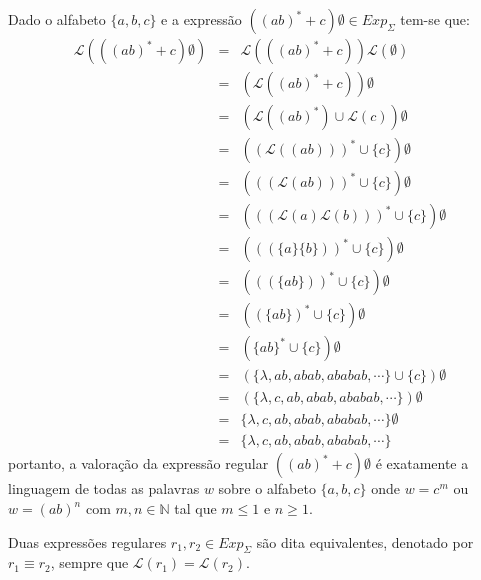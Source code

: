 \begin{example}
	Dado o alfabeto $\{a,b,c\}$ e a expressão $((ab)^* + c)\emptyset \in Exp_\Sigma$ tem-se que:
	\begin{eqnarray*}
		\mathcal{L}(((ab)^* + c) \emptyset) & = & \mathcal{L}(((ab)^* + c))\mathcal{L}(\emptyset)\\
		& = & (\mathcal{L}((ab)^* + c))\emptyset\\
		& = & (\mathcal{L}((ab)^*) \cup \mathcal{L}(c))\emptyset\\
		& = & ((\mathcal{L}((ab)))^* \cup \{c\})\emptyset\\
		& = & (((\mathcal{L}(ab)))^* \cup \{c\})\emptyset\\
		& = & (((\mathcal{L}(a)\mathcal{L}(b)))^* \cup \{c\})\emptyset\\
		& = & (((\{a\}\{b\}))^* \cup \{c\})\emptyset\\
		& = & (((\{ab\}))^* \cup \{c\})\emptyset\\
		& = & ((\{ab\})^* \cup \{c\})\emptyset\\
		& = & (\{ab\}^* \cup \{c\})\emptyset\\
		& = & (\{\lambda, ab, abab, ababab, \cdots\} \cup \{c\})\emptyset\\
		& = & (\{\lambda, c, ab, abab, ababab, \cdots\})\emptyset\\
		& = & \{\lambda, c, ab, abab, ababab, \cdots\}\emptyset\\
		& = & \{\lambda, c, ab, abab, ababab, \cdots\}
	\end{eqnarray*}
	portanto, a valoração da expressão regular $((ab)^* + c)\emptyset$ é exatamente a linguagem de todas as palavras $w$ sobre o alfabeto $\{a,b,c\}$  onde $w = c^m$ ou $w = (ab)^n$ com $m,n \in \mathbb{N}$ tal que $m \leq 1$ e $n \geq 1$.
\end{example}

\begin{definition}
	Duas expressões regulares $r_1, r_2 \in Exp_\Sigma$ são dita equivalentes, denotado por $r_1 \equiv r_2$, sempre que $\mathcal{L}(r_1) = \mathcal{L}(r_2)$.
\end{definition}

